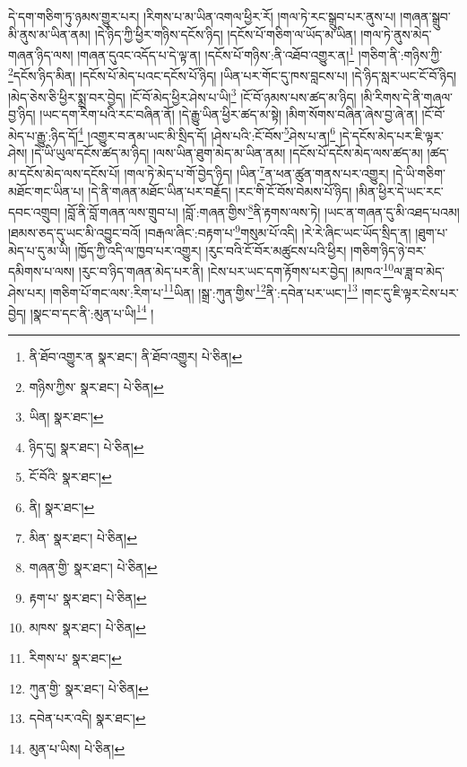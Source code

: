 དེ་དག་གཅིག་ཏུ་ཉམས་གྱུར་པར། །རིགས་པ་མ་ཡིན་འགལ་ཕྱིར་རོ། །གལ་ཏེ་རང་སྒྲུབ་པར་ནུས་པ། །གཞན་སྒྲུབ་མི་ནུས་མ་ཡིན་ནམ། །དེ་ཉིད་ཀྱི་ཕྱིར་གཉིས་དངོས་ཉིད། །དངོས་པོ་གཅིག་ལ་ཡོད་མ་ཡིན། །གལ་ཏེ་ནུས་མེད་གཞན་ཉིད་ལས། །གཞན་དུའང་འདོད་པ་དེ་ལྟ་ན། །དངོས་པོ་གཉིས་:ནི་འཐོབ་འགྱུར་ན།\footnote{ནི་ཐོབ་འགྱུར་ན  སྣར་ཐང་། ནི་ཐོབ་འགྱུར།  པེ་ཅིན། } །གཅིག་ནི་:གཉིས་ཀྱི་\footnote{གཉིས་ཀྱིས་  སྣར་ཐང་།  པེ་ཅིན། }དངོས་ཉིད་མིན། །དངོས་པོ་མེད་པའང་དངོས་པོ་ཉིད། །ཡིན་པར་གོང་དུ་ཁས་བླངས་པ། །དེ་ཉིད་སླར་ཡང་ངོ་བོ་ཉིད། །མེད་ཅེས་ཅི་ཕྱིར་སྨྲ་བར་བྱེད། །ངོ་བོ་མེད་ཕྱིར་ཤེས་པ་ཡི།\footnote{ཡིན།  སྣར་ཐང་། } །ངོ་བོ་ཉམས་པས་ཚད་མ་ཉིད། །མི་རིགས་དེ་ནི་གཞལ་བྱ་ཉིད། །ཡང་དག་རིག་པའི་རང་བཞིན་ནོ། །དེ་རྒྱུ་ཡིན་ཕྱིར་ཚད་མ་སྟེ། །མིག་སོགས་བཞིན་ཞེས་བྱ་ཞེ་ན། །ངོ་བོ་མེད་པ་རྒྱུ་:ཉིད་དོ།\footnote{ཉིད་དུ།  སྣར་ཐང་།  པེ་ཅིན། } །འགྱུར་བ་ནམ་ཡང་མི་སྲིད་དོ། །ཤེས་པའི་:ངོ་བོས་\footnote{ངོ་བོའི་  སྣར་ཐང་། }ཤེས་པ་ན།\footnote{ནི།  སྣར་ཐང་། } །དེ་དངོས་མེད་པར་ཇི་ལྟར་ཤེས། །དེ་ཡི་ཡུལ་དངོས་ཚད་མ་ཉིད། །ལས་ཡིན་ཐུག་མེད་མ་ཡིན་ནམ། །དངོས་པོ་དངོས་མེད་ལས་ཚད་མ། །ཚད་མ་དངོས་མེད་ལས་དངོས་པོ། །གལ་ཏེ་མེད་པ་གོ་བྱེད་ཉིད། །ཡིན་\footnote{མིན་  སྣར་ཐང་།  པེ་ཅིན། }ན་ཕན་ཚུན་གནས་པར་འགྱུར། །དེ་ཡི་གཅིག་མཐོང་གང་ཡིན་པ། །དེ་ནི་གཞན་མཐོང་ཡིན་པར་བརྗོད། །རང་གི་ངོ་བོས་བེམས་པོ་ཉིད། །མིན་ཕྱིར་དེ་ཡང་རང་དབང་འགྲུབ། །བློ་ནི་བློ་གཞན་ལས་གྲུབ་པ། །བློ་:གཞན་གྱིས་\footnote{གཞན་གྱི་  སྣར་ཐང་།  པེ་ཅིན། }ནི་རྟགས་ལས་ཏེ། །ཡང་ན་གཞན་དུ་མི་འཐད་པའམ། །ཐམས་ཅད་དུ་ཡང་མི་འབྱུང་བའོ། །བརྒལ་ཞིང་:བརྟག་པ་\footnote{རྟག་པ་  སྣར་ཐང་།  པེ་ཅིན། }གསུམ་པོ་འདི། །རེ་རེ་ཞིང་ཡང་ཡོད་སྲིད་ན། །ཐུག་པ་མེད་པ་དུ་མ་ཡི། །ཁྱོད་ཀྱི་འདི་ལ་ཁྱབ་པར་འགྱུར། །རུང་བའི་ངོ་བོར་མཚུངས་པའི་ཕྱིར། །གཅིག་ཉིད་ཉེ་བར་དམིགས་པ་ལས། །རུང་བ་ཉིད་གཞན་མེད་པར་ནི། །ངེས་པར་ཡང་དག་རྟོགས་པར་བྱེད། །མཁའ་\footnote{མཁས་  སྣར་ཐང་།  པེ་ཅིན། }ལ་ཟླ་བ་མེད་ཤེས་པར། །གཅིག་པོ་གང་ལས་:རིག་པ་\footnote{རིགས་པ་  སྣར་ཐང་། }ཡིན། །སྒྲ་:ཀུན་གྱིས་\footnote{ཀུན་གྱི་  སྣར་ཐང་།  པེ་ཅིན། }ནི་:དབེན་པར་ཡང་།\footnote{དབེན་པར་འདི།  སྣར་ཐང་། } །གང་དུ་ཇི་ལྟར་ངེས་པར་བྱེད། །སྣང་བ་དང་ནི་:མུན་པ་ཡི།\footnote{མུན་པ་ཡིས།  པེ་ཅིན། } །

